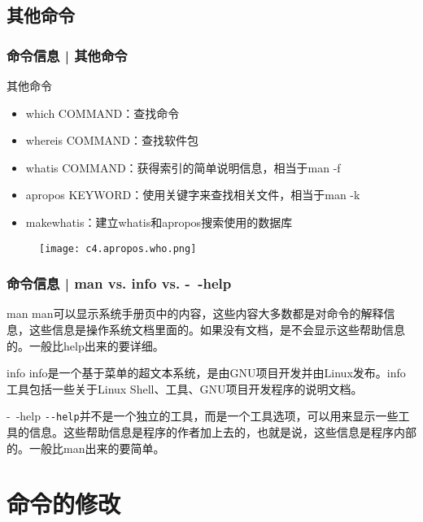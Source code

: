 \subsection{其他命令}
\begin{frame}
  \frametitle{命令信息 | 其他命令}
  \begin{block}{其他命令}
    \begin{itemize}
      \item which COMMAND：查找命令
      \item whereis COMMAND：查找软件包
      \item whatis COMMAND：获得索引的简单说明信息，相当于man -f
      \item apropos KEYWORD：使用关键字来查找相关文件，相当于man -k
      \item makewhatis：建立whatis和apropos搜索使用的数据库
    \end{itemize}
  \end{block}
  \begin{figure}
    \centering
    \texttt{[image: c4.apropos.who.png]}
  \end{figure}
\end{frame}

\begin{frame}[fragile]
  \frametitle{命令信息 | man vs. info vs. -\ -help}
  \begin{block}{man}
    man可以显示系统手册页中的内容，这些内容大多数都是对命令的解释信息，这些信息是操作系统文档里面的。如果没有文档，是不会显示这些帮助信息的。一般比help出来的要详细。
  \end{block}
  \pause
  \begin{block}{info}
    info是一个基于菜单的超文本系统，是由GNU项目开发并由Linux发布。info工具包括一些关于Linux Shell、工具、GNU项目开发程序的说明文档。
  \end{block}
  \pause
  \begin{block}{-\ -help}
    \verb|--help|并不是一个独立的工具，而是一个工具选项，可以用来显示一些工具的信息。这些帮助信息是程序的作者加上去的，也就是说，这些信息是程序内部的。一般比man出来的要简单。
  \end{block}
\end{frame}

\section{命令的修改}
